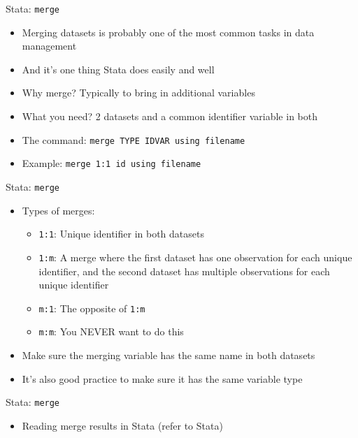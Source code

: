 \documentclass[11pt,notes=hide,aspectratio=169,mathserif]{beamer}
\begin{document}
\begin{frame}{Stata: \texttt{merge}}
\begin{itemize}
\item Merging datasets is probably one of the most common tasks in data management
\item And it's one thing Stata does easily and well
\item Why merge? Typically to bring in additional variables
\item What you need? 2 datasets and a common identifier variable in both
\pause \item The command: \texttt{merge TYPE IDVAR using filename}
\pause \item Example: \texttt{merge 1:1 id using filename}
\end{itemize}
\end{frame}

\begin{frame}{Stata: \texttt{merge}}
\begin{itemize}
\item Types of merges:
\begin{itemize}
    \pause \item \texttt{1:1}: Unique identifier in both datasets
    \pause \item \texttt{1:m}: A merge where the first dataset has one observation for each unique identifier, and the second dataset has multiple observations for each unique identifier
    \pause \item \texttt{m:1}: The opposite of \texttt{1:m}
    \pause \item \texttt{m:m}: You NEVER want to do this
\end{itemize}
\pause \item Make sure the merging variable has the same name in both datasets
\pause \item It's also good practice to make sure it has the same variable type 
\end{itemize}
\end{frame}

\begin{frame}{Stata: \texttt{merge}}
\begin{itemize}
\item Reading merge results in Stata (refer to Stata)
\end{itemize}
\end{frame}
    
\end{document}
